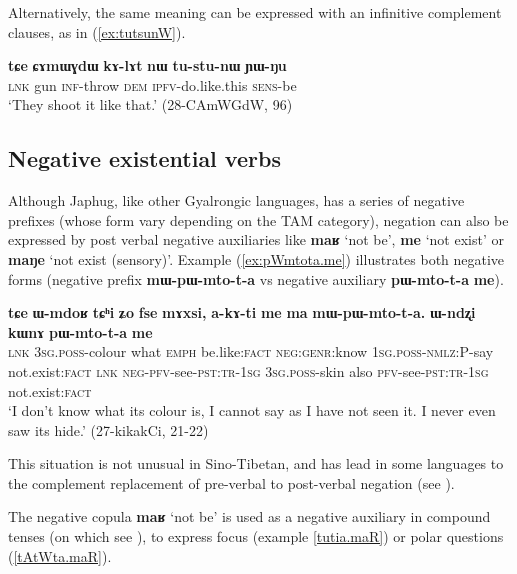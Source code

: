 \documentclass[oneside,a4paper,11pt]{article}
\newcommand{\ipa}[1]{\textbf{\phon#1}} %
\newcommand{\jpg}[2]{\ipa{#1} `#2'} %
\newcommand{\refb}[1]{(\ref{#1})}
\begin{document}
 Alternatively, the same meaning can be expressed with an infinitive complement clauses, as in \refb{ex:tutsunW}.
 
 \begin{exe}
\ex \label{ex:tutsunW}
\gll \ipa{tɕe} 	\ipa{ɕɤmɯɣdɯ} 	\ipa{kɤ-lɤt} 	\ipa{nɯ} 	\ipa{tu-stu-nɯ} 	\ipa{ɲɯ-ŋu}  \\
\textsc{lnk} gun \textsc{inf}-throw \textsc{dem} \textsc{ipfv}-do.like.this \textsc{sens}-be \\
\glt `They shoot it like that.' (28-CAmWGdW, 96)
\end{exe}

\subsection{Negative existential verbs} \label{sec:neg}
Although Japhug, like other Gyalrongic languages, has a series of negative prefixes (whose form vary depending on the TAM category), negation can also be expressed by post verbal negative auxiliaries like \jpg{maʁ}{not be}, \jpg{me}{not exist} or \jpg{maŋe}{not exist (sensory)}. Example \refb{ex:pWmtota.me} illustrates both negative forms (negative prefix \ipa{mɯ-pɯ-mto-t-a} vs negative auxiliary \ipa{pɯ-mto-t-a}  \ipa{me}).

\begin{exe}
\ex \label{ex:pWmtota.me}
\gll  
\ipa{tɕe} 	\ipa{ɯ-mdoʁ} 	\ipa{tɕʰi} 	\ipa{ʑo} 	\ipa{fse} 	\ipa{mɤxsi,} 	\ipa{a-kɤ-ti} 	\ipa{me} 	\ipa{ma} 	\ipa{mɯ-pɯ-mto-t-a.} \ipa{ɯ-ndʐi} 	\ipa{kɯnɤ} 	\ipa{pɯ-mto-t-a} 	\ipa{me}  \\
\textsc{lnk} \textsc{3sg.poss}-colour what \textsc{emph} be.like:\textsc{fact} \textsc{neg:genr}:know \textsc{1sg.poss-nmlz:P}-say not.exist:\textsc{fact} \textsc{lnk} \textsc{neg-pfv}-see-\textsc{pst:tr-1sg}  \textsc{3sg.poss}-skin also  \textsc{pfv}-see-\textsc{pst:tr-1sg} not.exist:\textsc{fact} \\
\glt  `I don't know what its colour is, I cannot say as I have not seen it. I never even saw its hide.'  (27-kikakCi, 21-22)
\end{exe}

This situation is not unusual in Sino-Tibetan, and has lead in some languages to the complement replacement of pre-verbal  to post-verbal negation (see \citealt{post15neg}).

The negative copula \jpg{maʁ}{not be} is used as a negative auxiliary in compound tenses (on which see \citealt[268-9]{jacques14linking}), to express focus (example \ref{tutia.maR}) or polar questions (\ref{tAtWta.maR}).
 
\end{document}
